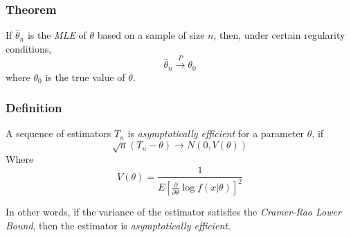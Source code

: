 \documentclass{article}
\begin{document}
\subsubsection{Theorem}
If $\hat{\theta}_n$ is the \textit{MLE} of $\theta$ based on a sample of size $n$, then, under certain regularity conditions,
\begin{equation*}
    \hat{\theta}_n \xrightarrow{P} \theta_0
\end{equation*}
where $\theta_0$ is the true value of $\theta$.

\subsubsection{Definition}
A sequence of estimators $T_n$ is \textit{asymptotically efficient} for a parameter $\theta$, if
\begin{equation*}
    \sqrt{n}(T_n - \theta) \to N(0,V(\theta))
\end{equation*}
Where
\begin{equation*}
    V(\theta) = \frac{1}{E\left[\frac{\partial}{\partial \theta} \log f(x|\theta) \right]^2}
\end{equation*}

In other words, if the variance of the estimator satisfies the \textit{Cramer-Rao Lower Bound}, then the estimator is \textit{asymptotically efficient}.
\end{document}
